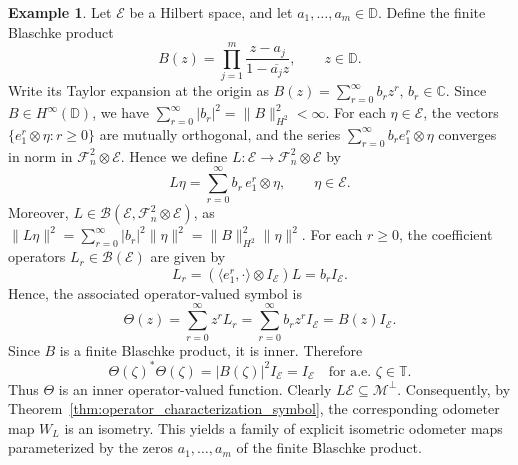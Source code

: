 \documentclass[12pt]{amsart}
\theoremstyle{definition}
\newtheorem{example}[theorem]{Example}
\theoremstyle{remark}
\def \D{\mathbb{D}}
\def \T{\mathbb{T}}
\newcommand{\clb}{\mathcal{B}}
\newcommand{\cle}{\mathcal{E}}
\newcommand{\clm}{\mathcal{M}}
\newcommand{\clf}{\mathcal{F}}
\numberwithin{equation}{section}
\begin{document}
\begin{example}
Let \(\cle\) be a Hilbert space, and let \(a_1,\dots,a_m\in \D\). Define the
finite Blaschke product
\[
B(z)=\prod_{j=1}^m \frac{z-a_j}{1-\overline{a_j}z},
\qquad z\in \D.
\]
Write its Taylor expansion at the origin as $B(z)=\sum_{r=0}^{\infty} b_r z^r,
\, b_r\in \mathbb C.$
Since \(B\in H^\infty(\D)\), we have $\sum_{r=0}^{\infty}|b_r|^2=\|B\|_{H^2}^2<\infty.$ For each \(\eta\in\cle\), the vectors \(\{e_1^r\otimes\eta:r\geq0\}\) are
mutually orthogonal, and the series
\(\sum_{r=0}^{\infty} b_r e_1^r\otimes\eta\) converges in norm in
\(\clf_n^2\otimes\cle\).
Hence we define
\(L:\cle\to \clf_n^2\otimes \cle\) by
\[
L\eta=\sum_{r=0}^{\infty} b_r\, e_1^r\otimes \eta,
\qquad \eta\in \cle.
\]
Moreover, \(L\in \clb(\cle,\clf_n^2\otimes \cle)\), as $\|L\eta\|^2
=
\sum_{r=0}^{\infty}|b_r|^2\|\eta\|^2
=
\|B\|_{H^2}^2\|\eta\|^2.$
For each \(r\geq 0\), the coefficient operators \(L_r\in \clb(\cle)\) are given by
\[
L_r
=
(\langle e_1^r,\cdot\rangle\otimes I_\cle)L
=
b_r I_\cle.
\]
Hence, the associated operator-valued symbol is
\[
\Theta(z)
=
\sum_{r=0}^{\infty} z^r L_r
=
\sum_{r=0}^{\infty} b_r z^r I_\cle
=
B(z)I_\cle.
\]
Since \(B\) is a finite Blaschke product, it is inner. Therefore
\[
\Theta(\zeta)^*\Theta(\zeta)
=
|B(\zeta)|^2 I_\cle
=
I_\cle
\quad \text{for a.e. } \zeta\in\T.
\]
Thus \(\Theta\) is an inner operator-valued function. Clearly \(L\cle\subseteq\clm^\perp\). Consequently, by
Theorem~\ref{thm:operator_characterization_symbol}, the corresponding
odometer map \(W_L\) is an isometry.
This yields a family of explicit isometric odometer maps parameterized by the
zeros \(a_1,\dots,a_m\) of the finite Blaschke product.
\end{example}
\end{document}
